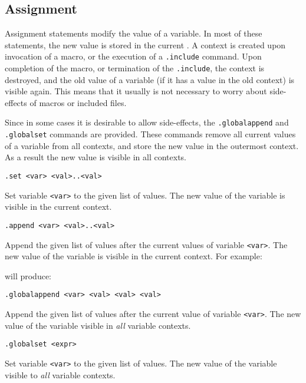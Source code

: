\subsection{Assignment}
\label{s.assignment}
Assignment statements modify the value of a variable. In most of these
statements, the new value is stored in the current .
A context is created upon invocation of a macro, or the execution of a
\verb'.include' command. Upon completion of the macro, or termination
of the \verb'.include', the context is destroyed, and the old value of
a variable (if it has a value in the old context) is visible again.
This means that it usually is not necessary to worry about side-effects
of macros or included files.
\par
Since in some cases it is desirable to allow side-effects, the
\verb'.globalappend' and \verb'.globalset' commands are provided.
These commands remove all current values of a variable from all
contexts, and store the new value in the outermost context. As a result
the new value is visible in all contexts.
\begin{verbatim}
.set <var> <val>..<val>
\end{verbatim}
\begin{desc}
Set variable {\tt <var>} to the given list of values.
The new value of the variable is visible in the current context.
\end{desc}
\begin{verbatim}
.append <var> <val>..<val>
\end{verbatim}
\begin{desc}
Append the given list of values after the current values of variable
{\tt <var>}.
The new value of the variable is visible in the current context.
For example:
\begin{showfile}

\end{showfile}
will produce:
\begin{showfile}

\end{showfile}
\end{desc}
\begin{verbatim}
.globalappend <var> <val> <val> <val>
\end{verbatim}
\begin{desc}
Append the given list of values after the current value of variable
\verb'<var>'. The new value of the variable visible in {\em all}
variable contexts.
\end{desc}
\begin{verbatim}
.globalset <expr>
\end{verbatim}
\begin{desc}
Set variable \verb'<var>' to the given list of values.  The new value
of the variable visible to {\em all} variable contexts.
\end{desc}
